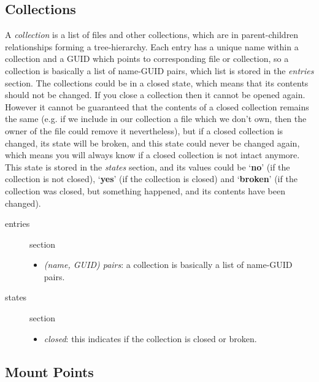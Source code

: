 \documentclass{book}
\begin{document}
\subsection{Collections} %
\label{sub:collections}

A \emph{collection} is a list of files and other collections, which are in parent-children relationships forming a tree-hierarchy. Each entry has a unique name within a collection and a GUID which points to corresponding file or collection, so a collection is basically a list of name-GUID pairs, which list is stored in the \emph{entries} section. The collections could be in a closed state, which means that its contents should not be changed. If you close a collection then it cannot be opened again. However it cannot be guaranteed that the contents of a closed collection remains the same (e.g. if we include in our collection a file which we don't own, then the owner of the file could remove it nevertheless), but if a closed collection is changed, its state will be broken, and this state could never be changed again, which means you will always know if a closed collection is not intact anymore. This state is stored in the \emph{states} section, and its values could be `\textbf{no}' (if the collection is not closed), `\textbf{yes}' (if the collection is closed) and `\textbf{broken}' (if the collection was closed, but something happened, and its contents have been changed).

\begin{description}
    \item [entries] section 
    \begin{itemize}
        \item \emph{(name, GUID) pairs}: a collection is basically a list of name-GUID pairs. 
    \end{itemize}
    \item [states] section 
    \begin{itemize}
        \item \emph{closed}: this indicates if the collection is closed or broken. 
    \end{itemize}
\end{description}


\subsection{Mount Points} %
\label{sub:mount_points}
\end{document}

